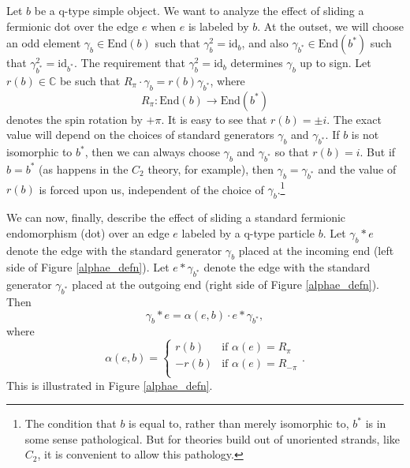 \documentclass[12pt,a4paper]{article}
\newcommand{\cc}{\mathbb{C}}
\newcommand\be            {\begin{equation}}
\newcommand\ee            {\end{equation}}
\newcommand{\id}{\text{id}}
\newcommand{\End}{\text{End}}
\begin{document}
Let $b$ be a q-type simple object.
We want to analyze the effect of sliding a fermionic dot over the edge $e$ when $e$ is labeled by $b$.
At the outset, we will choose an odd element $\gamma_b\in\End(b)$ such that $\gamma_b^2 = \id_b$, and also
$\gamma_{b^*}\in\End(b^*)$ such that $\gamma_{b^*}^2 = \id_{b^*}$.
The requirement that $\gamma_b^2 = \id_b$ determines $\gamma_b$ up to sign.
Let $r(b)\in\cc$ be such that $R_\pi\cdot\gamma_b = r(b)\gamma_{b^*}$, where
\be
	R_\pi : \End(b) \to \End(b^*)
\ee
denotes the spin rotation by $+\pi$.
It is easy to see that $r(b) = \pm i$.
The exact value will depend on the choices of standard generators $\gamma_b$ and $\gamma_{b^*}$.
If $b$ is not isomorphic to $b^*$, then we can always choose $\gamma_b$ and $\gamma_{b^*}$ so that $r(b) = i$.
But if $b = b^*$ (as happens in the $C_2$ theory, for example), then $\gamma_b = \gamma_{b^*}$ and the value of $r(b)$
is forced upon us, independent of the choice of $\gamma_b$.\footnote{
The condition that $b$ is equal to, rather than merely isomorphic to, $b^*$ is in some sense pathological.
But for theories build out of unoriented strands, like $C_2$, it is convenient to allow this pathology.}

We can now, finally, describe the effect of sliding a standard fermionic endomorphism (dot) over an edge $e$ labeled by 
a q-type particle $b$.
Let $\gamma_b * e$ denote the edge with the standard generator $\gamma_b$ placed at the incoming end (left side of Figure \ref{alphae_defn}).
Let $e* \gamma_{b^*}$ denote the edge with the standard generator $\gamma_{b^*}$ placed at the outgoing end (right side of Figure \ref{alphae_defn}).
Then
\be
	\gamma_b * e = \alpha(e, b) \cdot e* \gamma_{b^*} ,
	\label{fermion_slide}
\ee
where
\be
	\alpha(e, b) =  \left\{   \begin{array}{ll}  
		r(b) & \mbox{if $\alpha(e) = R_\pi$} \\
		-r(b) & \mbox{if $\alpha(e) = R_{-\pi}$} \\
	\end{array}  \right. .
\ee
This is illustrated in Figure \ref{alphae_defn}.
\end{document}

